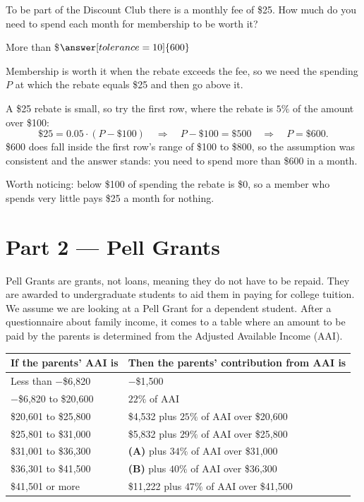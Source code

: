 \documentclass[12pt]{ximera}
\begin{document}
\begin{problem}
To be part of the Discount Club there is a monthly fee of \$25. How much do you need to
spend each month for membership to be worth it?

More than \$$\answer[tolerance=10]{600}$

\begin{freeResponse}
\end{freeResponse}

\begin{solution}
Membership is worth it when the rebate exceeds the fee, so we need the spending $P$ at
which the rebate equals \$25 and then go above it.

A \$25 rebate is small, so try the first row, where the rebate is $5\%$ of the amount
over \$100:
\[
\$25 = 0.05 \cdot (P - \$100)
\quad\Longrightarrow\quad
P - \$100 = \$500
\quad\Longrightarrow\quad
P = \$600.
\]
\$600 does fall inside the first row's range of \$100 to \$800, so the assumption was
consistent and the answer stands: you need to spend more than \$600 in a month.

Worth noticing: below \$100 of spending the rebate is \$0, so a member who spends very
little pays \$25 a month for nothing.
\end{solution}
\end{problem}

\section*{Part 2 --- Pell Grants}

Pell Grants are grants, not loans, meaning they do not have to be repaid. They are
awarded to undergraduate students to aid them in paying for college tuition. We assume
we are looking at a Pell Grant for a dependent student. After a questionnaire about
family income, it comes to a table where an amount to be paid by the parents is
determined from the Adjusted Available Income (AAI).

\begin{center}
\begin{tabular}{|l|l|}
\hline
\textbf{If the parents' AAI is} & \textbf{Then the parents' contribution from AAI is} \\
\hline
Less than $-$\$6,820      & $-$\$1,500 \\
\hline
$-$\$6,820 to \$20,600    & $22\%$ of AAI \\
\hline
\$20,601 to \$25,800      & \$4,532 plus $25\%$ of AAI over \$20,600 \\
\hline
\$25,801 to \$31,000      & \$5,832 plus $29\%$ of AAI over \$25,800 \\
\hline
\$31,001 to \$36,300      & \textbf{(A)} plus $34\%$ of AAI over \$31,000 \\
\hline
\$36,301 to \$41,500      & \textbf{(B)} plus $40\%$ of AAI over \$36,300 \\
\hline
\$41,501 or more          & \$11,222 plus $47\%$ of AAI over \$41,500 \\
\hline
\end{tabular}
\end{center}
\end{document}
